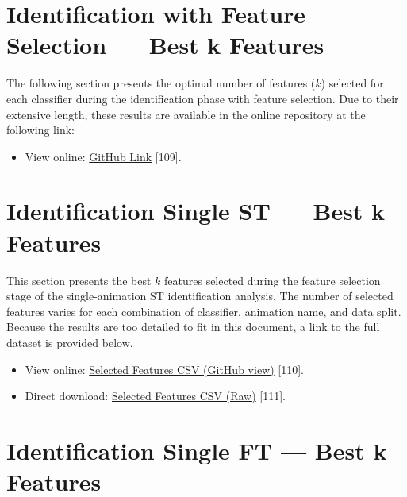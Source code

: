 \documentclass[12pt]{report}
\begin{document}
\FloatBarrier


\section{Identification with Feature Selection — Best k Features}
\label{subsec:id_fs_k}

The following section presents the optimal number of features ($k$) selected for each classifier during the identification phase with feature selection.
Due to their extensive length, these results are available in the online repository at the following link:

\begin{itemize}
    \item View online: 
    \href{https://github.com/DavideMascheroni99/movingText/tree/main/Programs/Machine_Learning/Machine_Learning_results/Identification_results/Identification_KBest/Feature}
    {GitHub Link} [109].
\end{itemize}
\FloatBarrier

\section{Identification Single ST — Best k Features}

This section presents the best $k$ features selected during the feature selection stage of the single-animation ST identification analysis.
The number of selected features varies for each combination of classifier, animation name, and data split. 
Because the results are too detailed to fit in this document, a link to the full dataset is provided below.

\begin{itemize}
    \item View online: 
    \href{https://github.com/DavideMascheroni99/movingText/blob/main/Programs/Machine_Learning/Machine_Learning_results/Identification_single_results/selected_features_st.csv}
    {Selected Features CSV (GitHub view)} [110].
    \item Direct download: 
    \href{https://github.com/DavideMascheroni99/movingText/raw/main/Programs/Machine_Learning/Machine_Learning_results/Identification_single_results/selected_features_st.csv}
    {Selected Features CSV (Raw)} [111].
\end{itemize}
\FloatBarrier

\section{Identification Single FT — Best k Features}
\label{subsec:topk_ft}
\end{document}
